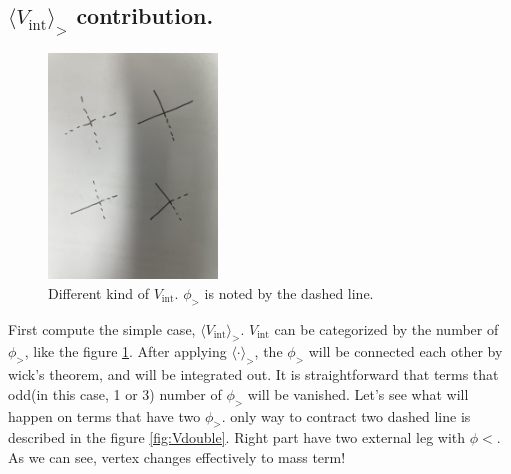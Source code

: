 \documentclass[12pt,halfline,a4paper]{ouparticle}
\begin{document}
\subsection{$\langle V_\text{int} \rangle_>$ contribution.} 
\begin{figure}[ht]
	\centering
	\includegraphics[width=0.4\textwidth]{Fig2.jpeg}
	\caption{Different kind of $V_\text{int}$. $\phi_>$ is noted by the dashed line.} 
	\label{fig:Vsing}
\end{figure}
First compute the simple case, $\langle V_\text{int} \rangle_>$. $V_\text{int}$ can be categorized by the number of $\phi_>$, like the figure \ref{fig:Vsing}.
After applying $\langle \cdot \rangle_>$, the $\phi_>$ will be connected each other by wick's theorem, and will be integrated out.
It is straightforward that terms that odd(in this case, 1 or 3) number of $\phi_>$ will be vanished.
Let's see what will happen on terms that have two $\phi_>$.
only way to contract two dashed line is described in the figure \ref{fig:Vdouble}. Right part have two external leg with $\phi<$. As we can see, vertex changes effectively to mass term!
\end{document}
